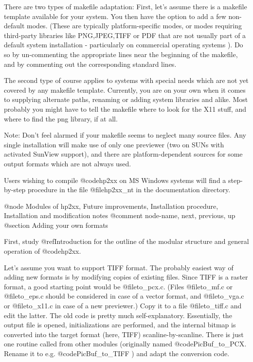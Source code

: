 There are two types of makefile adaptation: First, let's assume there
is a makefile template available for your system. You then have the option to
add a few non-default modes. (These are typically platform-specific modes,
or modes requiring third-party libraries like PNG,JPEG,TIFF or PDF that are
not usually part of a default system installation - particularly on commercial
operating systems ). Do so by un-commenting the appropriate lines
near the beginning of the makefile, and by commenting out the corresponding
standard lines.

The second type of course applies to systems with special needs which are not
yet covered by any makefile template. Currently, you are on your own when
it comes to supplying alternate paths, renaming or adding system libraries
and alike. Most probably you might have to tell the makefile where to
look for the X11 stuff, and where to find the png library, if at all.

Note: Don't feel alarmed if your makefile seems to neglect many source files.
Any single installation will make use of only one previewer (two on
SUNs with activated SunView support), and there are platform-dependent
sources for some output formats which are not always used.

Users wishing to compile @code{hp2xx} on MS Windows systems will find a
step-by-step procedure in the file @file{hp2xx_nt} in the documentation directory.


@node Modules of hp2xx, Future improvements, Installation procedure, Installation and modification notes
@comment  node-name,  next,  previous,  up
@section Adding your own formats

First, study @ref{Introduction} for the outline of the modular structure and
general operation of @code{hp2xx}.

Let's assume you want to support TIFF format. The probably easiest way
of adding new formats is by modifying copies of existing files. Since TIFF
is a raster format, a good starting point would be @file{to_pcx.c}.
(Files @file{to_mf.c} or @file{to_eps.c} should be considered in case
of a vector format, and @file{to_vga.c} or @file{to_x11.c} in case of
a new previewer.) Copy it to a file @file{to_tiff.c} and edit the latter.
The old code is pretty much self-explanatory. Essentially, the output file
is opened, initializations are performed, and the internal bitmap is
converted into the target format (here, TIFF) scanline-by-scanline.
There is just one routine called from other modules (originally named
@code{PicBuf_to_PCX}. Rename it to e.g. @code{PicBuf_to_TIFF} ) and adapt
the conversion code.

